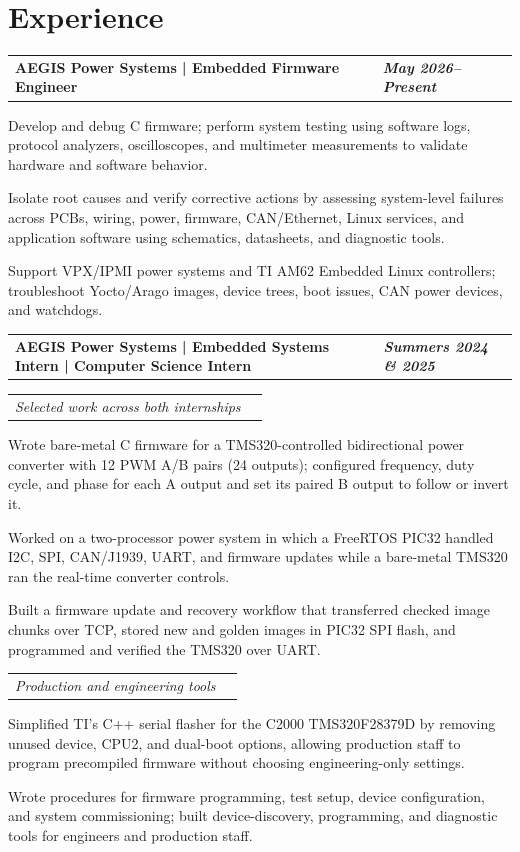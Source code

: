\documentclass[10pt,letterpaper]{article}
\makeatletter
\newcommand{\resumeentry}[2]{%
  \begin{tabularx}{\textwidth}{@{}X>{\raggedleft\arraybackslash}p{2.40in}@{}}
    \textbf{#1} & \textbf{\textit{#2}}
  \end{tabularx}\vspace{-0.075cm}
}
\newcommand{\descriptorentry}[1]{%
  \begin{tabularx}{\textwidth}{@{}X>{\raggedleft\arraybackslash}p{2.40in}@{}}
    \textit{#1} &
  \end{tabularx}\vspace{-0.075cm}
}
\makeatother
\begin{document}
\section{Experience}
\resumeentry{AEGIS Power Systems | Embedded Firmware Engineer}{May 2026--Present}
\begin{resumebullets}
  \item Develop and debug C firmware; perform system testing using software logs, protocol analyzers, oscilloscopes, and multimeter measurements to validate hardware and software behavior.
  \item Isolate root causes and verify corrective actions by assessing system-level failures across PCBs, wiring, power, firmware, CAN/Ethernet, Linux services, and application software using schematics, datasheets, and diagnostic tools.
  \item Support VPX/IPMI power systems and TI AM62 Embedded Linux controllers; troubleshoot Yocto/Arago images, device trees, boot issues, CAN power devices, and watchdogs.
\end{resumebullets}


\resumeentry{AEGIS Power Systems | Embedded Systems Intern | Computer Science Intern}{Summers 2024 \& 2025}
\descriptorentry{Selected work across both internships}
\begin{resumebullets}
  \item Wrote bare-metal C firmware for a TMS320-controlled bidirectional power converter with 12 PWM A/B pairs (24 outputs); configured frequency, duty cycle, and phase for each A output and set its paired B output to follow or invert it.
  \item Worked on a two-processor power system in which a FreeRTOS PIC32 handled I2C, SPI, CAN/J1939, UART, and firmware updates while a bare-metal TMS320 ran the real-time converter controls.
  \item Built a firmware update and recovery workflow that transferred checked image chunks over TCP, stored new and golden images in PIC32 SPI flash, and programmed and verified the TMS320 over UART.
\end{resumebullets}

\descriptorentry{Production and engineering tools}
\begin{resumebullets}
  \item Simplified TI's C++ serial flasher for the C2000 TMS320F28379D by removing unused device, CPU2, and dual-boot options, allowing production staff to program precompiled firmware without choosing engineering-only settings.
  \item Wrote procedures for firmware programming, test setup, device configuration, and system commissioning; built device-discovery, programming, and diagnostic tools for engineers and production staff.
\end{resumebullets}
\end{document}
